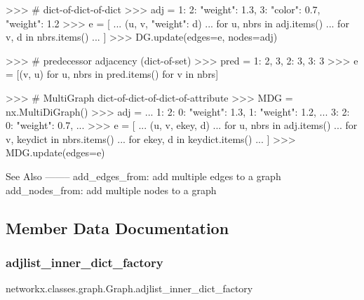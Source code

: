 \begin{DoxyVerb}
>>> # dict-of-dict-of-dict
>>> adj = {1: {2: {"weight": 1.3}, 3: {"color": 0.7, "weight": 1.2}}}
>>> e = [
...     (u, v, {"weight": d})
...     for u, nbrs in adj.items()
...     for v, d in nbrs.items()
... ]
>>> DG.update(edges=e, nodes=adj)

>>> # predecessor adjacency (dict-of-set)
>>> pred = {1: {2, 3}, 2: {3}, 3: {3}}
>>> e = [(v, u) for u, nbrs in pred.items() for v in nbrs]

>>> # MultiGraph dict-of-dict-of-dict-of-attribute
>>> MDG = nx.MultiDiGraph()
>>> adj = {
...     1: {2: {0: {"weight": 1.3}, 1: {"weight": 1.2}}},
...     3: {2: {0: {"weight": 0.7}}},
... }
>>> e = [
...     (u, v, ekey, d)
...     for u, nbrs in adj.items()
...     for v, keydict in nbrs.items()
...     for ekey, d in keydict.items()
... ]
>>> MDG.update(edges=e)

See Also
--------
add_edges_from: add multiple edges to a graph
add_nodes_from: add multiple nodes to a graph
\end{DoxyVerb}
 

\subsection{Member Data Documentation}
\mbox{\label{classnetworkx_1_1classes_1_1graph_1_1Graph_ab593ab5fd9a3ba30a183ea504ad00e15}} 
\subsubsection{\texorpdfstring{adjlist\+\_\+inner\+\_\+dict\+\_\+factory}{adjlist\_inner\_dict\_factory}}
{\footnotesize\ttfamily networkx.\+classes.\+graph.\+Graph.\+adjlist\+\_\+inner\+\_\+dict\+\_\+factory\hspace{0.3cm}{\ttfamily [static]}}

\mbox{\label{classnetworkx_1_1classes_1_1graph_1_1Graph_a2dc3fe24b55b16360fd12b9a4a076909}} 
